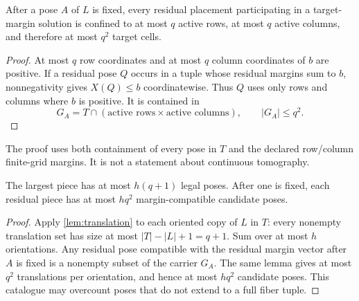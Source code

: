 \begin{lemma}\label{lem:active}
After a pose \(A\) of \(L\) is fixed, every residual placement participating
in a target-margin solution is confined to at most \(q\) active rows, at
most \(q\) active columns, and therefore at most \(q^2\) target cells.
\end{lemma}

\begin{proof}
At most \(q\) row coordinates and at most \(q\) column coordinates of \(b\)
are positive.  If a residual pose \(Q\) occurs in a tuple whose residual
margins sum to \(b\), nonnegativity gives \(X(Q)\leq b\) coordinatewise.
Thus \(Q\) uses only rows and columns where \(b\) is positive.  It is
contained in
\[
  G_A=T\cap(\text{active rows}\times\text{active columns}),
  \qquad |G_A|\leq q^2.
\]
\end{proof}

The proof uses both containment of every pose in \(T\) and the declared
row/column finite-grid margins.  It is not a statement about continuous
tomography.

\begin{corollary}\label{cor:pose-bounds}
The largest piece has at most \(h(q+1)\) legal poses.  After one is fixed,
each residual piece has at most \(hq^2\) margin-compatible candidate poses.
\end{corollary}

\begin{proof}
Apply \cref{lem:translation} to each oriented copy of \(L\) in \(T\):
every nonempty translation set has size at most
\(|T|-|L|+1=q+1\).  Sum over at most \(h\) orientations.  Any residual pose
compatible with the residual margin vector after \(A\) is fixed is a nonempty
subset of the carrier \(G_A\).  The same lemma gives at most \(q^2\)
translations per orientation, and hence at most \(hq^2\) candidate poses.
This catalogue may overcount poses that do not extend to a full fiber tuple.
\end{proof}
